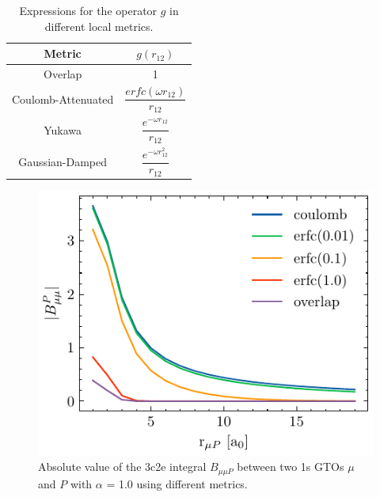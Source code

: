 \begin{table}
\centering
\begin{tabular}{cc}
\hline
Metric & $g(r_{12})$ \\ \hline
\multirow{2}{*}{Overlap \cite{Bae1973}} & \multirow{2}{*}{1} \\ & \\
\multirow{3}{*}{Coulomb-Attenuated \cite{Jun2005}} & \multirow{3}{*}{$\dfrac{erfc(\omega r_{12})}{r_{12}}$} \\ & \\ & \\
\multirow{3}{*}{Yukawa \cite{Gil2005}} & \multirow{3}{*}{$\dfrac{e^{-\omega r_{12}}}{r_{12}}$} \\ & \\ & \\
\multirow{3}{*}{Gaussian-Damped \cite{Rei2008}} & \multirow{3}{*}{$\dfrac{e^{-\omega r_{12}^2}}{r_{12}}$} \\ & \\ & \\ \hline
\end{tabular}
\caption{Expressions for the operator $g$ in different local metrics.}
\label{tab:DFMETRICS}
\end{table}

\begin{figure}
\centering
\includegraphics[scale=1.0]{ldf.pdf}
\caption{Absolute value of the 3c2e integral $B_{\mu\mu P}$ between two 1s GTOs $\mu$ and $P$ with $\alpha$ = 1.0 using different metrics.}
\label{fig:DFMETRICS}
\end{figure}


